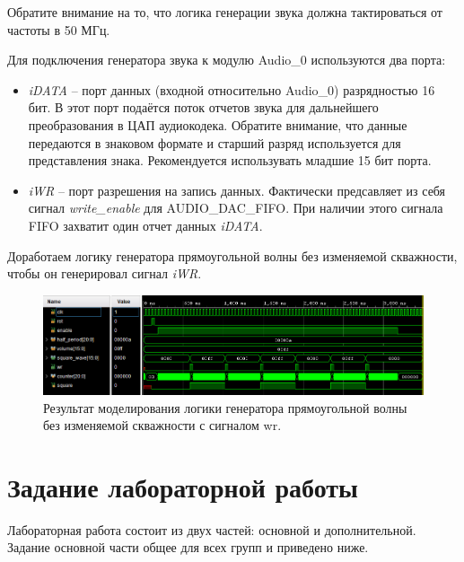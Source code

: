 Обратите внимание на то, что логика генерации звука должна тактироваться от частоты в 50 МГц.



Для подключения генератора звука к модулю Audio\_0 используются два порта:
\begin{itemize}
	\item \textit{iDATA} -- порт данных (входной относительно Audio\_0) разрядностью 16 бит. В этот порт подаётся поток отчетов звука для дальнейшего преобразования в ЦАП аудиокодека. Обратите внимание, что данные передаются в знаковом формате и старший разряд используется для представления знака. Рекомендуется использувать младшие 15 бит порта.
	\item \textit{iWR} -- порт разрешения на запись данных. Фактически предсавляет из себя сигнал \textit{write\_enable} для AUDIO\_DAC\_FIFO. При наличии этого сигнала FIFO захватит один отчет данных \textit{iDATA}.

\end{itemize}


Доработаем логику генератора прямоугольной волны без изменяемой скважности, чтобы он генерировал сигнал \textit{iWR}.


	


\begin{figure}[H]
	\centering
	\includegraphics [width=1\textwidth] {images/lab_7/square_simulate3.png}
	\caption{Результат моделирования логики генератора прямоугольной волны без изменяемой скважности с сигналом wr.}
	\label{lab7:pic7}
\end{figure}

\section{Задание лабораторной работы}

Лабораторная работа состоит из двух частей: основной и дополнительной. Задание основной части общее для всех групп и приведено ниже.

